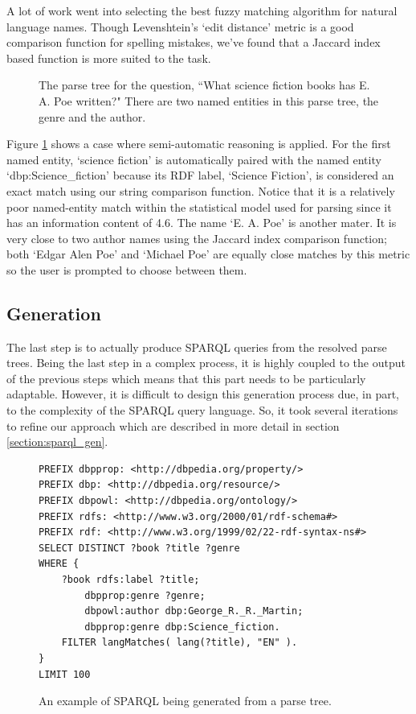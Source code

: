 \documentclass[11pt]{article}
\begin{document}
A lot of work went into selecting the best fuzzy matching algorithm for
natural language names. Though Levenshtein's `edit distance' metric
is a good comparison function for spelling mistakes, we've found that
a Jaccard index based function is more suited to the task. 

\begin{figure}[h!]
\caption{The parse tree for the question, 
``What science fiction books has E. A. Poe written?"
There are two named entities in this parse tree, the genre and the author.}
\label{fig:resolve}
\end{figure}

Figure \ref{fig:resolve} shows a case where semi-automatic reasoning is applied.
For the first named entity, `science fiction' is automatically paired with the
named entity `dbp:Science\_fiction' because its RDF label, `Science Fiction', is 
considered an exact match using our string comparison function. 
Notice that it is a relatively poor named-entity match within the statistical model
used for parsing since it has an information content of 4.6. 
The name `E. A. Poe' is another mater. It is
very close to two author names using the Jaccard index comparison function; both
`Edgar Alen Poe' and `Michael Poe' are equally close matches by this metric so the
user is prompted to choose between them.

\subsection{Generation}
\label{gen}
The last step is to actually produce SPARQL queries from the resolved parse trees.
Being the last step in a complex process, it is highly coupled to the output of the
previous steps which means that this part needs to be particularly adaptable.
However, it is difficult to design this generation process due, in part, 
to the complexity of the SPARQL query language. 
So, it took several iterations to refine our approach which are described
in more detail in section \ref{section:sparql_gen}.


\begin{figure}[h!]
\begin{verbatim}
PREFIX dbpprop: <http://dbpedia.org/property/>
PREFIX dbp: <http://dbpedia.org/resource/>
PREFIX dbpowl: <http://dbpedia.org/ontology/>
PREFIX rdfs: <http://www.w3.org/2000/01/rdf-schema#>
PREFIX rdf: <http://www.w3.org/1999/02/22-rdf-syntax-ns#>
SELECT DISTINCT ?book ?title ?genre
WHERE {
    ?book rdfs:label ?title;
        dbpprop:genre ?genre;
        dbpowl:author dbp:George_R._R._Martin;
        dbpprop:genre dbp:Science_fiction.
    FILTER langMatches( lang(?title), "EN" ).
}
LIMIT 100
\end{verbatim}
\caption{An example of SPARQL being generated from a parse tree.}
\label{fig:gen_example}
\end{figure}
\end{document}
